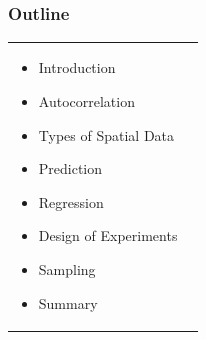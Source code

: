 \documentclass[mathserif,compress]{beamer}\usepackage{graphicx, color}
\newenvironment{knitrout}{}{} %
\def\bit{\begin{itemize}}
\def\eit{\end{itemize}}
\begin{document}
\subsection{}
\begin{frame} [fragile]
\frametitle{Outline}
   
	\begin{tabular} {p{3.8cm} p{5.8cm}}

		\begin{center}
		\vspace{-.3cm}
		\bit
			\item Introduction     
			\item Autocorrelation         
			\item Types of Spatial Data    
			\item Prediction    
			\item Regression 
			\item Design of Experiments 
			\item Sampling 
			\item Summary
		\eit
	\end{center}
 &
		\vspace{-1.4cm}






\begin{knitrout}\tiny
\definecolor{shadecolor}{rgb}{0.969, 0.969, 0.969}\color{fgcolor}


\end{knitrout}
\end{tabular}
\end{frame}
\end{document}
